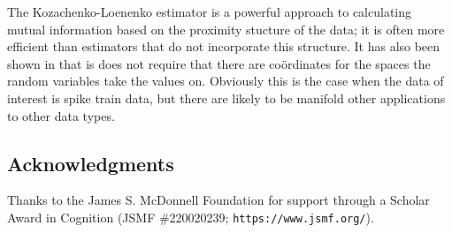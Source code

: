 \documentclass[12pt]{article}
\begin{document}
The Kozachenko-Loenenko estimator is a powerful approach to
calculating mutual information based on the proximity stucture of the
data; it is often more efficient than estimators that do not
incorporate this structure. It has also been shown in
\citet{Houghton2015} that is does not require that there are
co\"{o}rdinates for the spaces the random variables take the values
on. Obviously this is the case when the data of interest is spike
train data, but there are likely to be manifold other applications to
other data types.


\subsection*{Acknowledgments} Thanks to the  James S. McDonnell Foundation for support through a  Scholar Award in Cognition (JSMF \#220020239; \texttt{https://www.jsmf.org/}). 

{}

\end{document}
